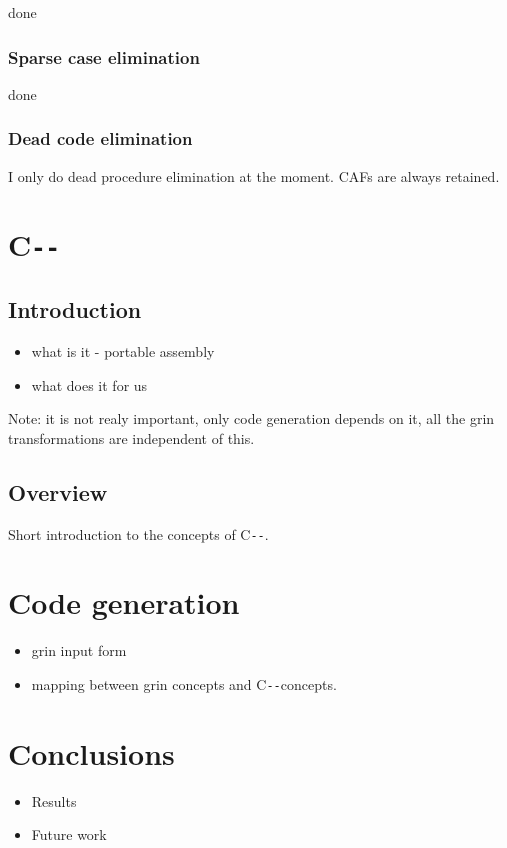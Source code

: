 \documentclass{book}
\newcommand{\cmm}{C\texttt{-\/-}}
\begin{document}
done

\subsection{Sparse case elimination}

done
\subsection{Dead code elimination}

I only do dead procedure elimination at the moment. CAFs are always retained.

\chapter{\cmm}

\section{Introduction}

\begin{itemize}
	\item what is it - portable assembly
	\item what does it for us
\end{itemize}

Note: it is not realy important, only code generation depends on it, all the
grin transformations are independent of this.

\section{Overview}

Short introduction to the concepts of \cmm.

\chapter{Code generation}

\begin{itemize}
	\item grin input form
	\item mapping between grin concepts and \cmm concepts.
\end{itemize}

\chapter{Conclusions}

\begin{itemize}
	\item Results
	\item Future work
\end{itemize}
\end{document}
